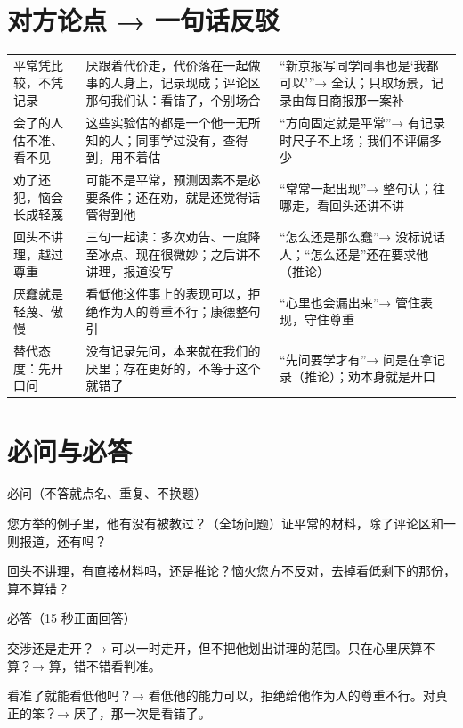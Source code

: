 \documentclass[quick,con]{debate}
\begin{document}
\section{对方论点 → 一句话反驳}
\begin{tabularx}{\linewidth}{@{}L{6.8em}Y Y@{}}\toprule
{}&&\\\midrule
平常凭比较，不凭记录&厌跟着代价走，代价落在一起做事的人身上，记录现成；评论区那句我们认：看错了，个别场合&“新京报写同学同事也是‘我都可以’”→ 全认；只取场景，记录由每日商报那一案补\\
会了的人估不准、看不见&这些实验估的都是一个他一无所知的人；同事学过没有，查得到，用不着估&“方向固定就是平常”→ 有记录时尺子不上场；我们不评偏多少\\
劝了还犯，恼会长成轻蔑&可能不是平常，预测因素不是必要条件；还在劝，就是还觉得话管得到他&“常常一起出现”→ 整句认；往哪走，看回头还讲不讲\\
回头不讲理，越过尊重&三句一起读：多次劝告、一度降至冰点、现在很微妙；之后讲不讲理，报道没写&“怎么还是那么蠢”→ 没标说话人；“怎么还是”还在要求他（推论）\\
厌蠢就是轻蔑、傲慢&看低他这件事上的表现可以，拒绝作为人的尊重不行；康德整句引&“心里也会漏出来”→ 管住表现，守住尊重\\
替代态度：先开口问&没有记录先问，本来就在我们的厌里；存在更好的，不等于这个就错了&“先问要学才有”→ 问是在拿记录（推论）；劝本身就是开口\\
\bottomrule\end{tabularx}

\section{必问与必答}
\begin{points}{必问（不答就点名、重复、不换题）}
\item 您方举的例子里，他有没有被教过？（全场问题）\quad 证平常的材料，除了评论区和一则报道，还有吗？
\item 回头不讲理，有直接材料吗，还是推论？\quad 恼火您方不反对，去掉看低剩下的那份，算不算错？
\end{points}
\begin{points}{必答（15 秒正面回答）}
\item 交涉还是走开？→ 可以一时走开，但不把他划出讲理的范围。\quad 只在心里厌算不算？→ 算，错不错看判准。
\item 看准了就能看低他吗？→ 看低他的能力可以，拒绝给他作为人的尊重不行。\quad 对真正的笨？→ 厌了，那一次是看错了。
\end{points}
\end{document}
